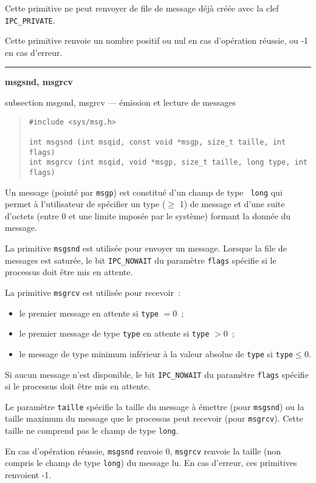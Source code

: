 \documentclass [twoside] {report}
\newcommand {\primitive} [1]
    {
	{\large \bf #1}
	\addcontentsline {toc} {subsection} {#1}
    }
\newcommand {\separation}
    {
	\vspace {7mm}
	\nopagebreak
	\hrule
    }
\begin{document}
Cette primitive ne peut renvoyer de file de message déjà créée avec la
clef {\tt IPC\_PRIVATE}.

Cette primitive renvoie un nombre positif ou nul en cas d'opération
réussie, ou -1 en cas d'erreur.


\separation
\primitive {msgsnd, msgrcv} --- émission et lecture de messages

\begin {quote}
\begin {verbatim}
#include <sys/msg.h>

int msgsnd (int msqid, const void *msgp, size_t taille, int flags)
int msgrcv (int msqid, void *msgp, size_t taille, long type, int flags)
\end{verbatim}
\end {quote}

Un message (pointé par {\tt msgp}) est constitué d'un champ de type {\tt
long} qui permet à l'utilisateur de spécifier un type ($\geq$ 1) de message
et d'une suite d'octets (entre 0 et une limite imposée
par le système) formant la donnée du message.

La primitive {\tt msgsnd} est utilisée pour envoyer un message.  Lorsque
la file de messages est saturée, le bit {\tt IPC\_NOWAIT} du paramètre
{\tt flags} spécifie si le processus doit être mis en attente.

La primitive {\tt msgrcv} est utilisée pour recevoir~:

\begin {itemize}
    \item le premier message en attente si {\tt type} $= 0$~;
    \item le premier message de type {\tt type} en attente si {\tt type}
	$> 0$~;
    \item le message de type minimum inférieur à la valeur absolue de
	{\tt type} si {\tt type}$\leq 0$.
\end {itemize}

Si aucun message n'est disponible, le bit {\tt IPC\_NOWAIT} du paramètre
{\tt flags} spécifie si le processus doit être mis en attente.

Le paramètre {\tt taille} spécifie la taille du message à émettre (pour
{\tt msgsnd}) ou la taille maximum du message que le processus peut
recevoir (pour {\tt msgrcv}).  Cette taille ne comprend pas le champ de
type {\tt long}.

En cas d'opération réussie, {\tt msgsnd} renvoie 0, {\tt msgrcv} renvoie
la taille (non compris le champ de type {\tt long}) du message lu.
En cas d'erreur, ces primitives renvoient -1.
\end{document}
